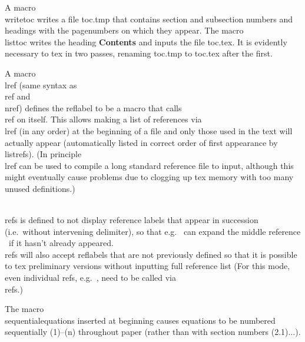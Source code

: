 A macro \\writetoc writes a file toc.tmp that contains section and
subsection  numbers and headings with the pagenumbers on which they appear.
The macro \\listtoc writes the heading {\bf Contents} and inputs the file
toc.tex. It is evidently necessary to tex in two passes, renaming toc.tmp
to toc.tex after the first.


A macro \\lref (same syntax as \\ref and \\nref) 
\lref{}
defines the reflabel to be a macro that calls \\ref on itself.
This allows making a list of references via \\lref (in any order) at the 
beginning of a file and only those used in the text will actually appear
(automatically listed in correct order of first appearance by \\listrefs).
(In principle \\lref can be used to compile a long standard reference file 
to input, although this might eventually cause problems due to clogging up tex
memory with too many unused definitions.)

\lref{}
\lref{}
\lref{}
\\refs is defined to not display reference labels that appear in succession
(i.e.\ without intervening delimiter), so that e.g.\ 
can expand the middle reference \rii\ if it hasn't already appeared.
\\refs will also accept reflabels that are not previously defined so that it is
possible to tex preliminary versions without inputting full reference list
(For this mode, even individual refs, e.g.\ , need to be
called via \\refs.)

The macro \\sequentialequations inserted at beginning causes 
equations to be numbered sequentially (1)--(n) throughout paper 
(rather than with section numbers (2.1)$\ldots$).

\listrefs
\listfigs   %
\bye
